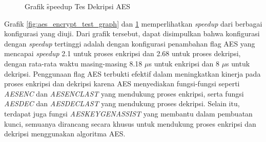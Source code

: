 \begin{figure}
    \centering
    \caption{Grafik \f{speedup} Tes Dekripsi AES}
    \label{fig:aes_decrypt_test_graph}
\end{figure}

Grafik \ref{fig:aes_encrypt_test_graph} dan \ref{fig:aes_decrypt_test_graph} memperlihatkan \textit{speedup} dari berbagai konfigurasi yang diuji. Dari grafik tersebut, dapat disimpulkan bahwa konfigurasi dengan \textit{speedup} tertinggi adalah dengan konfigurasi penambahan flag AES yang mencapai \textit{speedup} 2.1 untuk proses enkripsi dan 2.68 untuk proses dekripsi, dengan rata-rata waktu masing-masing 8.18 $\mu$s untuk enkripsi dan 8 $\mu$s untuk dekripsi. Penggunaan flag AES terbukti efektif dalam meningkatkan kinerja pada proses enkripsi dan dekripsi karena AES menyediakan fungsi-fungsi seperti \textit{AESENC} dan \textit{AESENCLAST} yang mendukung proses enkripsi, serta fungsi \textit{AESDEC} dan \textit{AESDECLAST} yang mendukung proses dekripsi. Selain itu, terdapat juga fungsi \textit{AESKEYGENASSIST} yang membantu dalam pembuatan kunci, semuanya dirancang secara khusus untuk mendukung proses enkripsi dan dekripsi menggunakan algoritma AES.

\iffalse

